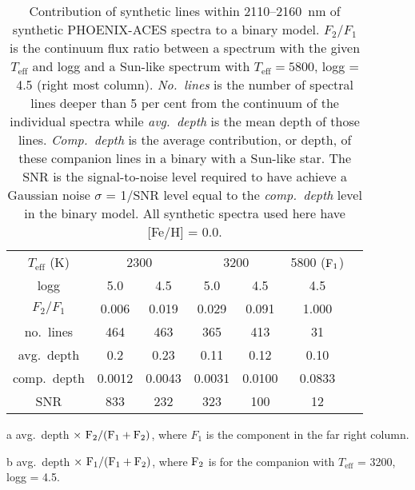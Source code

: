 \begin{table}
    \small
    \centering
    \begin{threeparttable}[b]

   \caption{Contribution of synthetic lines within 2110--2160~nm of synthetic PHOENIX-ACES spectra to a binary model. \(F_{2}/F_{1}\) is the continuum flux ratio between a spectrum with the given \(T_{\textrm{eff}}\) and logg and a Sun-like spectrum with \(T_{\textrm{eff}}=5800\), logg = 4.5 (right most column). \emph{No.\ lines} is the number of spectral lines deeper than 5 per cent from the continuum of the individual spectra while \emph{avg.\ depth} is the mean depth of those lines. \emph{Comp.\ depth} is the average contribution, or depth, of these companion lines in a binary with a Sun-like star. The SNR is the signal-to-noise level required to have achieve a Gaussian noise \(\sigma\) = 1/SNR level equal to the \emph{comp.\ depth} level in the binary model. All synthetic spectra used here have [Fe/H] = 0.0.}

    \begin{tabular}{*7c}
        \toprule
        \(T_{\textrm{eff}}\) (K)  & \multicolumn{2}{c}{2300} & \multicolumn{2}{c}{3200} & 5800 (\(\rm F_1\))\\
        logg & 5.0 & 4.5  & 5.0 & 4.5 & 4.5 \\
        \midrule
        \(F_2/F_1\) & 0.006 & 0.019 & 0.029  & 0.091 & 1.000 \\
        no.\ lines & 464 & 463 & 365  & 413 & 31 \\
        avg.\ depth & 0.2  & 0.23& 0.11 & 0.12 & 0.10 \\
        comp.\ depth\tnote{a} &  0.0012 & 0.0043 &  0.0031 & 0.0100&  0.0833\tnote{b} \\
        SNR  & 833 & 232 & 323  & 100 & 12 \\
        \bottomrule
    \end{tabular}\label{tab:line_contributions}
    \begin{tablenotes}
        \item [a] avg.\ depth \(\times~ \rm F_2 / (F_1 + F_2)\), where \(F_1\) is the component in the far right column.
        \item[b] avg.\ depth \(\times~ \rm F_1 / (F_1 + F_2)\), where \(\rm F_2\) is for the companion with \(T_{\textrm{eff}}\) = 3200, logg = 4.5.
    \end{tablenotes}
  \end{threeparttable}
\end{table}
